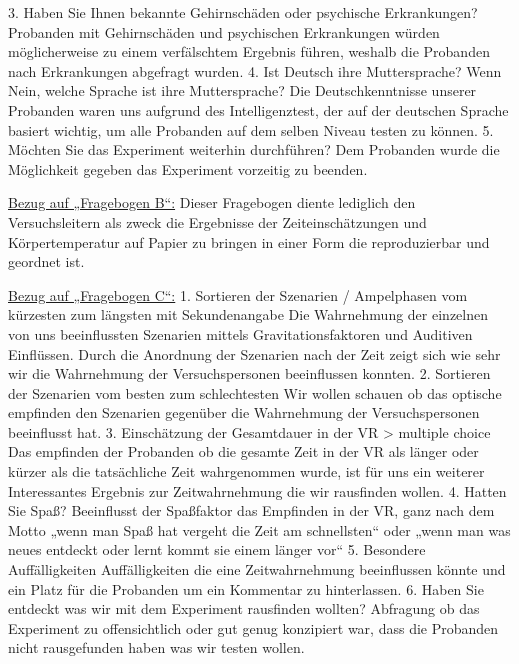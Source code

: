 \documentclass{Bericht}
\begin{document}
3. Haben Sie Ihnen bekannte Gehirnschäden oder psychische Erkrankungen?
Probanden mit Gehirnschäden und psychischen Erkrankungen würden möglicherweise zu einem
verfälschtem Ergebnis führen, weshalb die Probanden nach Erkrankungen abgefragt wurden.
4. Ist Deutsch ihre Muttersprache? Wenn Nein, welche Sprache ist ihre Muttersprache?
Die Deutschkenntnisse unserer Probanden waren uns aufgrund des Intelligenztest, der auf der
deutschen Sprache basiert wichtig, um alle Probanden auf dem selben Niveau testen zu können.
5. Möchten Sie das Experiment weiterhin durchführen?
Dem Probanden wurde die Möglichkeit gegeben das Experiment vorzeitig zu beenden.
\par
\underline{Bezug auf „Fragebogen B“:}
Dieser Fragebogen diente lediglich den Versuchsleitern als zweck die Ergebnisse der Zeiteinschätzungen
und Körpertemperatur auf Papier zu bringen in einer Form die reproduzierbar und
geordnet ist.
\par
\underline{Bezug auf „Fragebogen C“:}
1. Sortieren der Szenarien / Ampelphasen vom kürzesten zum längsten mit Sekundenangabe
Die Wahrnehmung der einzelnen von uns beeinflussten Szenarien mittels Gravitationsfaktoren
und Auditiven Einflüssen. Durch die Anordnung der Szenarien nach der Zeit zeigt sich wie sehr
wir die Wahrnehmung der Versuchspersonen beeinflussen konnten.
2. Sortieren der Szenarien vom besten zum schlechtesten
Wir wollen schauen ob das optische empfinden den Szenarien gegenüber die Wahrnehmung
der Versuchspersonen beeinflusst hat.
3. Einschätzung der Gesamtdauer in der VR > multiple choice
Das empfinden der Probanden ob die gesamte Zeit in der VR als länger oder kürzer als die tatsächliche
Zeit wahrgenommen wurde, ist für uns ein weiterer Interessantes Ergebnis zur Zeitwahrnehmung
die wir rausfinden wollen.
4. Hatten Sie Spaß?
Beeinflusst der Spaßfaktor das Empfinden in der VR, ganz nach dem Motto „wenn man Spaß
hat vergeht die Zeit am schnellsten“ oder „wenn man was neues entdeckt oder lernt kommt sie
einem länger vor“
5. Besondere Auffälligkeiten
Auffälligkeiten die eine Zeitwahrnehmung beeinflussen könnte und ein Platz für die Probanden
um ein Kommentar zu hinterlassen.
6. Haben Sie entdeckt was wir mit dem Experiment rausfinden wollten?
Abfragung ob das Experiment zu offensichtlich oder gut genug konzipiert war, dass die Probanden
nicht rausgefunden haben was wir testen wollen.
\end{document}
